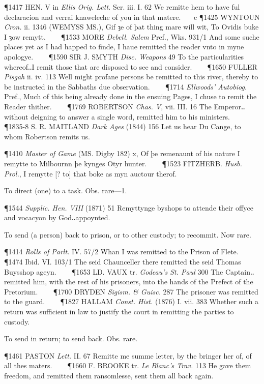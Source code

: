 \begin{description}[wide, labelwidth=!, labelindent=0pt]
\begin{myenumerate}
\P 1417 HEN. V in  \textit{Ellis Orig. Lett.} Ser. iii. I. 62 We remitte hem to have ful declaracion and verrai knaweleche of you in that matere.    c 
\P 1425 WYNTOUN  \textit{Cron.} ii. 1346 (WEMYSS  MS.), Gif ȝe of þat thing mare will wit, To Ovidis buke I ȝow remytt.    
\P 1533 MORE  \textit{Debell. Salem} Pref., Wks. 931/1 And some suche places yet as I had happed to finde, I haue remitted the reader vnto in myne apologye.    
\P 1590 SIR J. SMYTH  \textit{Disc. Weapons} 49 To the particularities whereof‥I remit those that are disposed to see and consider.    
\P 1650 FULLER  \textit{Pisgah} ii. iv. 113 Well might profane persons be remitted to this river, thereby to be instructed in the Sabbaths due observation.    
\P 1714 \textit{Ellwoods'  Autobiog.} Pref., Much of this being already done in the ensuing Pages, I chuse to remit the Reader thither.    
\P 1769 ROBERTSON  \textit{Chas. V}, vii. III. 16 The Emperor‥without deigning to answer a single word, remitted him to his ministers.    
\P 1835-8 S. R. MAITLAND \textit{Dark Ages} (1844) 156 Let us hear Du Cange, to whom Robertson remits us.

\P 1410 \textit{Master  of Game} (MS. Digby 182) x, Of þe remenaunt of his nature I remytte to Milbournn þe kynges Otyr hunter.    
\P 1523 FITZHERB.  \textit{Husb. Prol.}, I remytte [? to] that boke as myn auctour therof.

 To direct (one) to a task. Obs. rare—1.

\P 1544 \textit{Supplic.  Hen. VIII} (1871) 51 Remyttynge byshops to attende their offyce and vocacyon by God‥appoynted.

 To send (a person) back to prison, or to other custody; to recommit. Now rare.

\P 1414  \textit{Rolls of Parlt.} IV. 57/2 Whan I was remitted to the Prison of Flete.    
\P 1474  Ibid. VI. 103/1 The seid Chaunceller there remitted the seid Thomas Buysshop ageyn.    
\P 1653 LD. VAUX tr. \textit{Godeau's St. Paul} 300 The Captain‥remitted him, with the rest of his prisoners, into the hands of the Prefect of the Pretorium.    
\P 1700 DRYDEN  \textit{Sigism. \& Guisc.} 287 The prisoner was remitted to the guard.    
\P 1827 HALLAM  \textit{Const. Hist.} (1876) I. vii. 383 Whether such a return was sufficient in law to justify the court in remitting the parties to custody.

 To send in return; to send back. Obs. rare.

\P 1461 PASTON  \textit{Lett.} II. 67 Remitte me summe letter, by the bringer her of, of all thes maters.    
\P 1660 F. BROOKE tr. \textit{Le Blanc's Trav.} 113 He gave them freedom, and remitted them ransomlesse, sent them all back again.


\end{myenumerate}
\end{description}
